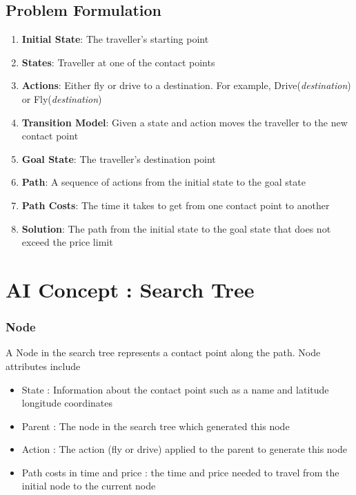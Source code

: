 \documentclass[11pt]{article}
\begin{document}
\subsection{Problem Formulation}
\begin{enumerate}
\item \textbf{Initial State}: The traveller's starting point
\item \textbf{States}: Traveller at one of the contact points
\item	 \textbf{Actions}: Either fly or drive to a destination. For example, Drive(\emph{destination}) or Fly(\emph{destination})
\item \textbf{Transition Model}: Given a state and action moves the traveller to the new contact point
\item \textbf{Goal State}: The traveller's destination point
\item \textbf{Path}: A sequence of actions from the initial state to the goal state
\item \textbf{Path Costs}: The time it takes to get from one contact point to another %
\item \textbf{Solution}: The path from the initial state to the goal state that does not exceed the price limit
\end{enumerate}


\section{AI Concept : Search Tree}

\subsubsection{Node} A Node in the search tree represents a contact point along the path. Node attributes include
\begin{itemize}
\item State : Information about the contact point such as a name and latitude longitude coordinates
\item Parent : The node in the search tree which generated this node
\item Action : The action (fly or drive) applied to the parent to generate this node
\item Path costs in time and price : the time and price needed to travel from the initial node to the current node
\end{itemize}
\end{document}
